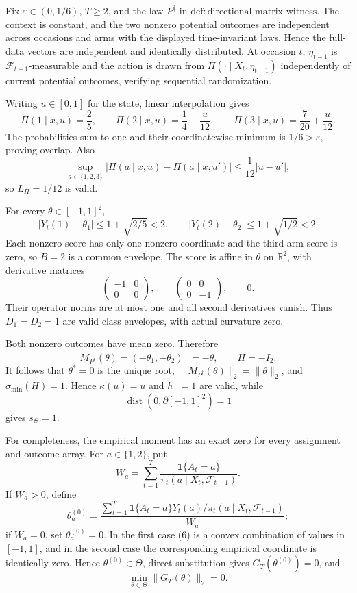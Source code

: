 Fix \(\varepsilon\in(0,1/6)\), \(T\ge2\), and the law \(P^{\dagger}\) in \(\mathrm{def:directional\text{-}matrix\text{-}witness}\). The context is constant, and the two nonzero potential outcomes are independent across occasions and arms with the displayed time-invariant laws. Hence the full-data vectors are independent and identically distributed. At occasion \(t\), \(\eta_{t-1}\) is \(\mathcal F_{t-1}\)-measurable and the action is drawn from \(\Pi(\cdot\mid X_t,\eta_{t-1})\) independently of current potential outcomes, verifying sequential randomization.

Writing \(u\in[0,1]\) for the state, linear interpolation gives
\[
 \Pi(1\mid x,u)=\frac25,\qquad
 \Pi(2\mid x,u)=\frac14-\frac{u}{12},\qquad
 \Pi(3\mid x,u)=\frac7{20}+\frac{u}{12}.
\tag{1}
\]
The probabilities sum to one and their coordinatewise minimum is \(1/6>\varepsilon\), proving overlap. Also
\[
 \sup_{a\in\{1,2,3\}}|\Pi(a\mid x,u)-\Pi(a\mid x,u')|
 \le\frac1{12}|u-u'|,
\tag{2}
\]
so \(L_\Pi=1/12\) is valid.

For every \(\theta\in[-1,1]^2\),
\[
 |Y_t(1)-\theta_1|\le1+\sqrt{2/5}<2,
 \qquad |Y_t(2)-\theta_2|\le1+\sqrt{1/2}<2.
\tag{3}
\]
Each nonzero score has only one nonzero coordinate and the third-arm score is zero, so \(B=2\) is a common envelope. The score is affine in \(\theta\) on \(\mathbb R^2\), with derivative matrices
\[
 \begin{pmatrix}-1&0\\0&0\end{pmatrix},\qquad
 \begin{pmatrix}0&0\\0&-1\end{pmatrix},\qquad 0.
\]
Their operator norms are at most one and all second derivatives vanish. Thus \(D_1=D_2=1\) are valid class envelopes, with actual curvature zero.

Both nonzero outcomes have mean zero. Therefore
\[
 M_{P^{\dagger}}(\theta)=(-\theta_1,-\theta_2)^\top=-\theta,
 \qquad H=-I_2.
\tag{4}
\]
It follows that \(\theta^*=0\) is the unique root, \(\|M_{P^{\dagger}}(\theta)\|_2=\|\theta\|_2\), and \(\sigma_{\min}(H)=1\). Hence \(\kappa(u)=u\) and \(h_-=1\) are valid, while
\[
 \operatorname{dist}(0,\partial[-1,1]^2)=1
\tag{5}
\]
gives \(s_\Theta=1\).

For completeness, the empirical moment has an exact zero for every assignment and outcome array. For \(a\in\{1,2\}\), put
\[
 W_a=\sum_{t=1}^T\frac{\mathbf1\{A_t=a\}}
 {\pi_t(a\mid X_t,\mathcal F_{t-1})}.
\]
If \(W_a>0\), define
\[
 \theta_a^{(0)}=
 \frac{\sum_{t=1}^T\mathbf1\{A_t=a\}Y_t(a)/
 \pi_t(a\mid X_t,\mathcal F_{t-1})}{W_a};
\tag{6}
\]
if \(W_a=0\), set \(\theta_a^{(0)}=0\). In the first case (6) is a convex combination of values in \([-1,1]\), and in the second case the corresponding empirical coordinate is identically zero. Hence \(\theta^{(0)}\in\Theta\), direct substitution gives \(G_T(\theta^{(0)})=0\), and
\[
 \min_{\theta\in\Theta}\|G_T(\theta)\|_2=0.
\tag{7}
\]

